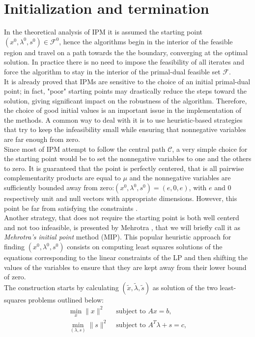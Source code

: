 \documentclass[a4paper,10 pt,titlepage,twoside]{book}
\theoremstyle{plain}
\theoremstyle{definition}
\theoremstyle{remark}
\begin{document}
\section*{Initialization and termination}
In the theoretical analysis of IPM it is assumed the starting point $(x^{0}, \lambda^{0}, s^{0})\in\mathcal{F}^{0}$, hence the algorithms begin in the interior of the feasible region and travel on
a path towards the the boundary, converging at the optimal solution. In practice there is no need to impose the feasibility of all iterates and force the algorithm to stay in the interior of the primal-dual feasible set $\mathcal{F}$.\\
It is already proved that IPMs are sensitive to the choice of an initial primal-dual point; in fact, "poor" starting points may drastically reduce the steps toward the solution, giving significant impact on the robustness of the algorithm. Therefore, the choice of good initial values is an important issue in the implementation of the methods. A common way to deal with it is to use heuristic-based strategies that try to keep the infeasibility small while ensuring that nonnegative variables are far enough from zero.\\
Since most of IPM attempt to follow the central path $\mathcal{C}$, a very simple choice for the starting point would be to set the nonnegative variables to one and the others to zero. It is guaranteed that the point is perfectly centered, that is all pairwise complementarity products are equal to $\mu$ and the nonnegative variables are sufficiently bounded away from zero:$(x^{0},\lambda^{0},s^{0})=(e, 0, e)$, with $e$ and $0$ respectively unit and null vectors with appropriate dimensions. However, this point be far from satisfying the constraints \cite{VAN}.\\
Another strategy, that does not require the starting point is both well centerd and not too infeasible, is presented by Mehrotra \cite{MER}, that we will briefly call it as \textit{Mehrotra's initial point} method (MIP). This popular heuristic approach for finding $(x^{0}, \lambda^{0}, s^{0})$ consists on computing least squares solutions of the equations corresponding to the linear constraints of the LP and then shifting the values of the variables to ensure that they are kept away from their lower bound of zero. \\
The construction starts by calculating $(\tilde{x}, \tilde{\lambda}, \tilde{s})$ as solution of the two least-squares problems outlined below:
\begin{align*}
\min\limits_{x} \lVert x \rVert ^{2} &\text{ subject to }Ax = b,\\
\min\limits_{(\lambda,s)} \lVert s \rVert ^{2} &\text{ subject to } A^{T}\lambda +s = c,
\end{align*}
\end{document}
